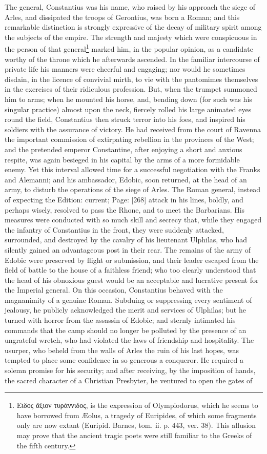 The general, Constantius was his name, who raised by his approach the siege of Arles, and dissipated the troops of Gerontius, was born a Roman; and this remarkable distinction is strongly expressive of the decay of military spirit among the subjects of the empire. The strength and majesty which were conspicuous in the person of that general\footnote{\textgreek{Ειδος \texthebrew{ἄ}ξιον τυράννιδος}, is the expression of Olympiodorus, which he seems to have borrowed from Æolus, a tragedy of Euripides, of which some fragments only are now extant (Euripid. Barnes, tom. ii. p. 443, ver. 38). This allusion may prove that the ancient tragic poets were still familiar to the Greeks of the fifth century.} marked him, in the popular opinion, as a candidate worthy of the throne which he afterwards ascended. In the familiar intercourse of private life his manners were cheerful and engaging; nor would he sometimes disdain, in the licence of convivial mirth, to vie with the pantomimes themselves in the exercises of their ridiculous profession. But, when the trumpet summoned him to arms; when he mounted his horse, and, bending down (for such was his singular practice) almost upon the neck, fiercely rolled his large animated eyes round the field, Constantius then struck terror into his foes, and inspired his soldiers with the assurance of victory. He had received from the court of Ravenna the important commission of extirpating rebellion in the provinces of the West; and the pretended emperor Constantine, after enjoying a short and anxious respite, was again besieged in his capital by the arms of a more formidable enemy. Yet this interval allowed time for a successful negotiation with the Franks and Alemanni; and his ambassador, Edobic, soon returned, at the head of an army, to disturb the operations of the siege of Arles. The Roman general, instead of expecting the Edition: current; Page: [268] attack in his lines, boldly, and perhaps wisely, resolved to pass the Rhone, and to meet the Barbarians. His measures were conducted with so much skill and secrecy that, while they engaged the infantry of Constantius in the front, they were suddenly attacked, surrounded, and destroyed by the cavalry of his lieutenant Ulphilas, who had silently gained an advantageous post in their rear. The remains of the army of Edobic were preserved by flight or submission, and their leader escaped from the field of battle to the house of a faithless friend; who too clearly understood that the head of his obnoxious guest would be an acceptable and lucrative present for the Imperial general. On this occasion, Constantius behaved with the magnanimity of a genuine Roman. Subduing or suppressing every sentiment of jealousy, he publicly acknowledged the merit and services of Ulphilas; but he turned with horror from the assassin of Edobic; and sternly intimated his commands that the camp should no longer be polluted by the presence of an ungrateful wretch, who had violated the laws of friendship and hospitality. The usurper, who beheld from the walls of Arles the ruin of his last hopes, was tempted to place some confidence in so generous a conqueror. He required a solemn promise for his security; and after receiving, by the imposition of hands, the sacred character of a Christian Presbyter, he ventured to open the gates of 